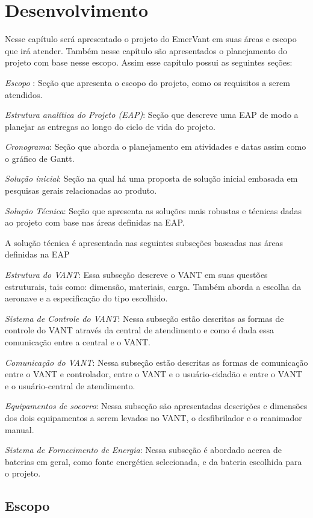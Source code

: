 \chapter{Desenvolvimento}\label{cap2}
 Nesse capítulo será apresentado o projeto do EmerVant em suas áreas e escopo que irá atender. Também nesse capítulo  são apresentados o planejamento do projeto com base nesse escopo. Assim esse capítulo possui as seguintes seções:

\textit{Escopo} : Seção que apresenta o escopo do projeto, como os requisitos a serem atendidos.

\textit{Estrutura analítica do Projeto (EAP)}: Seção que descreve uma  EAP de modo a planejar as entregas ao longo do ciclo de vida do projeto.

\textit{Cronograma}: Seção que aborda o planejamento em atividades e datas assim como o gráfico de Gantt.

\textit{Solução inicial}: Seção na qual há uma proposta de solução inicial embasada em pesquisas gerais relacionadas ao produto.

\textit{Solução Técnica}: Seção que apresenta as soluções mais robustas e técnicas dadas ao projeto com base nas áreas definidas na EAP.

A solução técnica é apresentada nas seguintes subseções baseadas nas áreas definidas na EAP

\textit{Estrutura do VANT}: Essa subseção descreve o VANT em suas questões estruturais, tais como: dimensão, materiais, carga. Também aborda a escolha da aeronave e a especificação do tipo escolhido.

\textit{Sistema de Controle do VANT}: Nessa subseção estão descritas as formas de controle do VANT através da central de atendimento e como é dada essa comunicação entre a central e o VANT.

\textit{Comunicação do VANT}: Nessa subseção estão descritas as formas de comunicação entre o VANT e controlador, entre o VANT e o usuário-cidadão e entre o VANT e o usuário-central de atendimento.

\textit{Equipamentos de socorro}: Nessa subseção são apresentadas descrições e dimensões dos dois equipamentos a serem levados no VANT, o desfibrilador e o reanimador manual.

\textit{Sistema de Fornecimento de Energia}: Nessa subseção é abordado acerca de baterias em geral, como fonte energética selecionada, e da bateria escolhida para o projeto.


 \section{Escopo}
  

